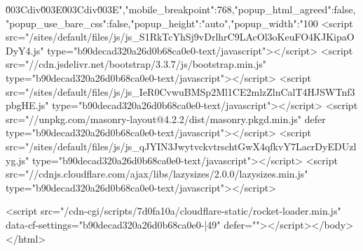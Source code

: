 \u003C\/div\u003E\n\u003C\/div\u003E","mobile_breakpoint":768,"popup_html_agreed":false,"popup_use_bare_css":false,"popup_height":"auto","popup_width":"100%
<script src="/sites/default/files/js/js_S1RkTcYhSj9vDrlhrC9LAcOl3oKeuFO4KJKipaODyY4.js" type="b90decad320a26d0b68ca0e0-text/javascript"></script>
<script src="//cdn.jsdelivr.net/bootstrap/3.3.7/js/bootstrap.min.js" type="b90decad320a26d0b68ca0e0-text/javascript"></script>
<script src="/sites/default/files/js/js_IeR0CvwuBMSp2Ml1CE2mlzZlnCalT4HJSWTnf3pbgHE.js" type="b90decad320a26d0b68ca0e0-text/javascript"></script>
<script src="//unpkg.com/masonry-layout@4.2.2/dist/masonry.pkgd.min.js" defer type="b90decad320a26d0b68ca0e0-text/javascript"></script>
<script src="/sites/default/files/js/js_qJYIN3JwytvckvtrschtGwX4qfkvY7LacrDyEDUzlyg.js" type="b90decad320a26d0b68ca0e0-text/javascript"></script>
<script src="//cdnjs.cloudflare.com/ajax/libs/lazysizes/2.0.0/lazysizes.min.js" type="b90decad320a26d0b68ca0e0-text/javascript"></script>

  <script src="/cdn-cgi/scripts/7d0fa10a/cloudflare-static/rocket-loader.min.js" data-cf-settings="b90decad320a26d0b68ca0e0-|49" defer=""></script></body>
</html>
